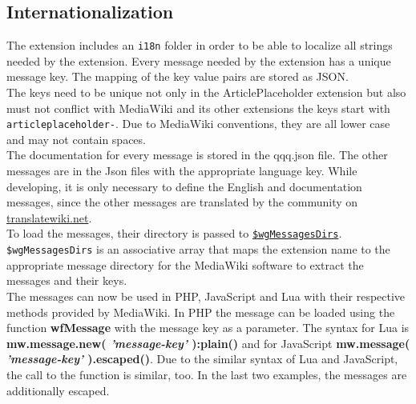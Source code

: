 \subsection{Internationalization}

The extension includes an \texttt{i18n} folder in order to be able to localize all strings needed by the extension. Every message needed by the extension has a unique message key. The mapping of the key value pairs are stored as JSON. \\
The keys need to be unique not only in the ArticlePlaceholder extension but also must not conflict with MediaWiki and its other extensions the keys start with \texttt{articleplaceholder-}. Due to MediaWiki conventions, they are all lower case and may not contain spaces.  \\
The documentation for every message is stored in the qqq.json file. The other messages are in the Json files with the appropriate language key. While developing, it is only necessary to define the English and documentation messages, since the other messages are translated by the community on \href{https://translatewiki.net/}{translatewiki.net}. \\
To load the messages, their directory is passed to \href{https://www.mediawiki.org/wiki/Manual:$wgMessagesDirs}{\texttt{\$wgMessagesDirs}}. \texttt{\$wgMessagesDirs} is an associative array that maps the extension name to the appropriate message directory for the MediaWiki software to extract the messages and their keys. \\
The messages can now be used in PHP, JavaScript and Lua with their respective methods provided by MediaWiki. In PHP the message can be loaded using the function \textbf{wfMessage} with the message key as a parameter. The syntax for Lua is \textbf{mw.message.new( \textit{'message-key'} ):plain()} and for JavaScript \textbf{mw.message( \textit{'message-key'} ).escaped()}. Due to the similar syntax of Lua and JavaScript, the call to the function is similar, too. In the last two examples, the messages are additionally escaped.